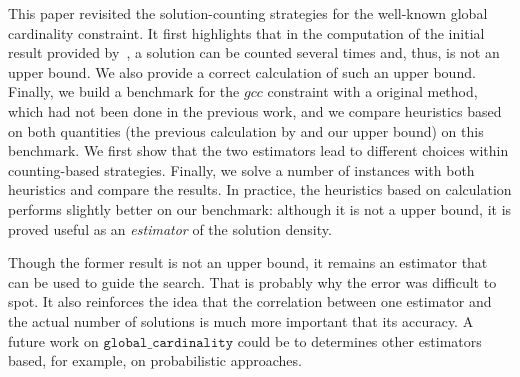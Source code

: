 

This paper revisited the solution-counting strategies for the well-known global cardinality constraint. It first highlights that in the computation of the initial result provided by~\cite{PesantQZ12}, a solution can be counted several times and, thus, is not an upper bound. We also provide a correct calculation of such an upper bound. Finally, we build a benchmark for the $gcc$ constraint with a original method, which had not been done in the previous work, and we compare heuristics based on both quantities (the previous calculation by \cite{PesantQZ12} and our upper bound) on this benchmark. We first show that the two estimators lead to different choices within counting-based strategies. Finally, we solve a number of instances with both heuristics and compare the results. In practice, the heuristics based on \cite{PesantQZ12} calculation performs slightly better on our benchmark: although it is not a upper bound, it is proved useful as an \textit{estimator} of the solution density.

 Though the former result is not an upper bound, it remains an estimator that can be used to guide the search. That is probably why the error was difficult to spot. It also reinforces the idea that the correlation between one estimator and the actual number of solutions is much more important that its accuracy. A future work on $\texttt{global\_cardinality}$ could be to determines other estimators based, for example, on probabilistic approaches.
 
 
 